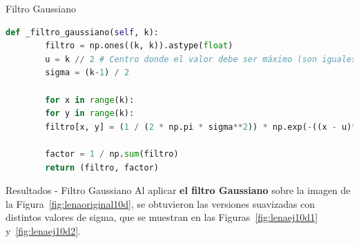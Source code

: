 \documentclass{beamer}
\begin{document}
\begin{frame}[fragile]{Filtro Gaussiano}
	\justifying
	
	\begin{lstlisting}[language=Python]
		def _filtro_gaussiano(self, k):
		filtro = np.ones((k, k)).astype(float)
		u = k // 2 # Centro donde el valor debe ser máximo (son iguales ya que es cuadrada)
		sigma = (k-1) / 2
		
		for x in range(k):
		for y in range(k):
		filtro[x, y] = (1 / (2 * np.pi * sigma**2)) * np.exp(-((x - u)**2 + (y - u)**2)/(2 * sigma**2))
		
		factor = 1 / np.sum(filtro)
		return (filtro, factor)
	\end{lstlisting}
\end{frame}

\begin{frame}[fragile]{Resultados - Filtro Gaussiano}
	\justifying
	Al aplicar \textcolor{unahurverde}{\textbf{el filtro Gaussiano}} sobre la imagen de la Figura~\ref{fig:lenaoriginal10d},  
	se obtuvieron las versiones suavizadas con distintos valores de sigma, que se muestran en las Figuras~\ref{fig:lenaej10d1} y~\ref{fig:lenaej10d2}.
	

\end{frame}
\end{document}
